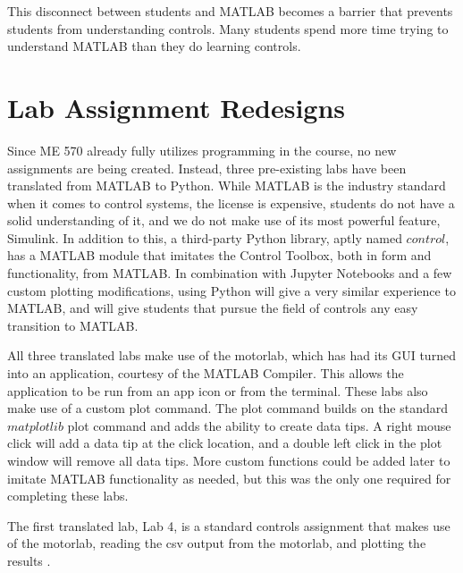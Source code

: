 This disconnect between students and MATLAB becomes a barrier that prevents students from understanding controls. Many students
spend more time trying to understand MATLAB than they do learning controls. 

\section{Lab Assignment Redesigns}

Since ME 570 already fully utilizes programming in the course, no new assignments are being created. Instead, three pre-existing
labs have been translated from MATLAB to Python. While MATLAB is the industry standard when it comes to control systems, the
license is expensive, students do not have a solid understanding of it, and we do not make use of its most powerful feature,
Simulink. In addition to this, a third-party Python library, aptly named $control$, has a MATLAB module that imitates the Control
Toolbox, both in form and functionality, from MATLAB. In combination with Jupyter Notebooks and a few custom plotting modifications,
using Python will give a very similar experience to MATLAB, and will give students that pursue the field of controls any easy
transition to MATLAB. 

All three translated labs make use of the motorlab, which has had its GUI turned into an application, courtesy of the MATLAB
Compiler. This allows the application to be run from an app icon or from the terminal. These labs also make use of a custom plot
command. The plot command builds on the standard $matplotlib$ \cite{Hunter_Matplotlib_A_2D_2007} plot command and adds the ability to 
create data tips. A right mouse click will add a data tip at the click location, and a double left click in the plot window 
will remove all data tips. More custom functions could be added later to imitate MATLAB functionality as needed, but this was the 
only one required for completing these labs.

The first translated lab, Lab 4, is a standard controls assignment that makes use of the motorlab, reading the csv output from the
motorlab, and plotting the results \cite{controls-4}. 

\label{control_assignment_1}

